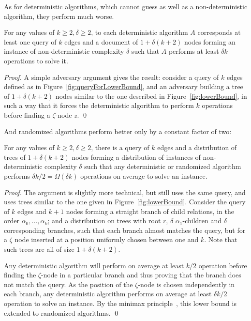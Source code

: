 As for deterministic algorithms, which cannot guess as well as a
non-deterministic algorithm, they perform much worse.
\begin{theorem}\label{th:lowerBound}
For any values of $k\geq2,\delta\geq2$, to each deterministic
algorithm $A$ corresponds at least one query of $k$ edges and a
document of $1+\delta (k+2)$ nodes forming an instance of
non-deterministic complexity $\delta$ such that $A$ performs at least
$\delta{k}$ operations to solve it.
\end{theorem}
\begin{proof}
A simple adversary argument gives the result: consider a query of $k$
edges defined as in Figure~\ref{fig:queryForLowerBound}, and an
adversary building a tree of $1+\delta (k+2)$ nodes similar to the one
described in Figure~\ref{fig:lowerBound}, in such a way that it forces
the deterministic algorithm to perform $k$ operations before finding a
$\zeta$-node $z$.
\qed\end{proof}

And randomized algorithms perform better only by a constant factor of two:
\begin{theorem}\label{th:randomizedLowerBound}
For any values of $k\geq2,\delta\geq2$, there is a query of $k$ edges
and a distribution of trees of $1+\delta (k+2)$ nodes forming a
distribution of instances of non-deterministic complexity $\delta$
such that any deterministic or randomized algorithm performs
$\delta k/2 = \Omega(\delta k)$ operations on average to solve an instance.
\end{theorem}
\begin{proof}
The argument is slightly more technical, but still uses the same
query, and uses trees similar to the one given in
Figure~\ref{fig:lowerBound}.
%
Consider the query of $k$ edges and $k+1$ nodes forming a straight
branch of child relations, in the order $\alpha_0,\ldots,\alpha_{k}$;
%
and a distribution on trees with root $r$, $\delta$
$\alpha_1$-children and $\delta$ corresponding branches, such that
each branch almost matches the query, but for a $\zeta$ node inserted
at a position uniformly chosen between one and $k$.
%
Note that such trees are all of size $1+\delta (k+2)$.

Any deterministic algorithm will perform on average at least $k/2$
operation before finding the $\zeta$-node in a particular branch and
thus proving that the branch does not match the query.
%
As the position of the $\zeta$-node is chosen independently in each
branch, any deterministic algorithm performs on average at least
$\delta k/2$ operation to solve an instance.
%
By the minimax principle~\cite{yao,vonneumann1944}, this lower bound
is extended to randomized algorithms.
\qed\end{proof}



